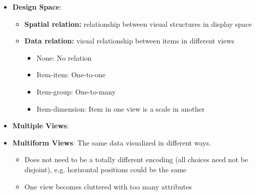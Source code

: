 \documentclass{report}
\begin{document}
\begin{itemize}
\begin{itemize}
\begin{itemize}
                    \end{itemize}
                \item \textbf{Drawbacks:}
                    \begin{itemize}
                        \item Limited space for the client visualizations
                        \item Clutter is high
                        \item Visual design dependencies are high
                    \end{itemize}
                \item \textbf{Applications:} Situations that call for augmenting a particular visual representation with additional mapping
            \end{itemize}
        \item \textbf{Design Space}: 
            \begin{itemize}
                \itme \textbf{Visualizations:} the techniques or idioms used
                \item \textbf{Spatial relation:} relationship between visual structures in display space
                \item \textbf{Data relation:} visual relationship between items in different views
                    \begin{itemize}
                        \item None: No relation
                        \item Item-item: One-to-one
                        \item Item-group: One-to-many
                        \item Item-dimension: Item in one view is a scale in another
                    \end{itemize}
            \end{itemize}
        \item \textbf{Multiple Views}: 
            \bigbreak \noindent 
        \item \textbf{Multiform Views}: The same data visualized in different ways.
            \begin{itemize}
                \item Does not need to be a totally different encoding (all choices need not be disjoint), e.g. horizontal positions could be the same
                \item One view becomes cluttered with too many attributes

\end{itemize}
\end{itemize}
\end{document}
